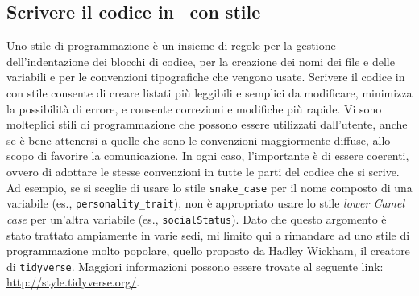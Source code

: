 \subsection*{Scrivere il codice in \R\, con stile}
\label{chapter:R_stile}

Uno stile di programmazione è un insieme di regole per la gestione dell'indentazione dei blocchi di codice, per la creazione dei nomi dei file e delle variabili e per le convenzioni tipografiche che vengono usate. 
Scrivere il codice in \R\, con stile consente di creare listati più leggibili e semplici da modificare, minimizza la possibilità di errore, e consente correzioni e modifiche più rapide.
Vi sono molteplici stili di programmazione che possono essere utilizzati dall'utente, anche se è bene attenersi a quelle che sono le convenzioni maggiormente diffuse, allo scopo di favorire la comunicazione. In ogni caso, l'importante è di essere coerenti, ovvero di adottare le stesse convenzioni in tutte le parti del codice che si scrive. 
Ad esempio, se si sceglie di usare lo stile {\tt snake\_case} per il nome composto di una variabile (es., {\tt personality\_trait}), non è appropriato usare lo stile \emph{lower Camel case} per un'altra variabile (es., {\tt socialStatus}). 
Dato che questo argomento è stato trattato ampiamente in varie sedi, mi limito qui a rimandare ad uno stile di programmazione molto popolare, quello proposto da Hadley Wickham, il creatore di {\tt tidyverse}. Maggiori informazioni possono essere trovate al seguente link: \url{http://style.tidyverse.org/}.



%
%
%
%


